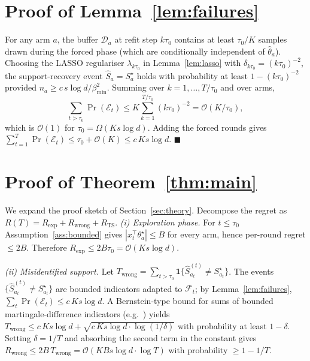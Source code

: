 \documentclass[10pt,journal,twoside,twocolumn]{IEEEtran}
\begin{document}
\section{Proof of Lemma~\ref{lem:failures}}\label{app:failures}

For any arm $a$, the buffer $\mathcal{D}_a$ at refit step $k\tau_0$ contains at least $\tau_0/K$ samples drawn during the forced phase (which are conditionally independent of $\hat\theta_a$). Choosing the LASSO regulariser $\lambda_{k\tau_0}$ in Lemma~\ref{lem:lasso} with $\delta_{k\tau_0} = (k\tau_0)^{-2}$, the support-recovery event $\hat{S}_a = S^\star_a$ holds with probability at least $1 - (k\tau_0)^{-2}$ provided $n_a \geq c\,s\log d/\beta_{\min}^2$. Summing over $k = 1, \dots, T/\tau_0$ and over arms,
\[
\sum_{t > \tau_0} \Pr(\mathcal{E}_t) \leq K \sum_{k=1}^{T/\tau_0} (k\tau_0)^{-2} = \mathcal{O}(K/\tau_0),
\]
which is $\mathcal{O}(1)$ for $\tau_0 = \Omega(Ks\log d)$. Adding the forced rounds gives $\sum_{t=1}^T \Pr(\mathcal{E}_t) \leq \tau_0 + \mathcal{O}(K) \leq c\,Ks\log d$. \hfill$\blacksquare$

\section{Proof of Theorem~\ref{thm:main}}\label{app:main}

We expand the proof sketch of Section~\ref{sec:theory}. Decompose the regret as
$
R(T) = R_{\mathrm{exp}} + R_{\mathrm{wrong}} + R_{\mathrm{TS}}.
$
\emph{(i) Exploration phase.} For $t \leq \tau_0$ Assumption~\ref{ass:bounded} gives $|x_t^\top \theta^\star_a| \leq B$ for every arm, hence per-round regret $\leq 2B$. Therefore $R_{\mathrm{exp}} \leq 2B\tau_0 = \mathcal{O}(Ks\log d)$.

\emph{(ii) Misidentified support.} Let $T_{\mathrm{wrong}} = \sum_{t > \tau_0} \mathbf{1}\{\hat{S}_{a_t}^{(t)} \neq S^\star_{a_t}\}$. The events $\{\hat{S}_{a_t}^{(t)} \neq S^\star_{a_t}\}$ are bounded indicators adapted to $\mathcal{F}_t$; by Lemma~\ref{lem:failures}, $\sum_t \Pr(\mathcal{E}_t) \leq c\,Ks\log d$. A Bernstein-type bound for sums of bounded martingale-difference indicators (e.g.~\cite[Sec.~A.7]{lattimore2020bandit}) yields $T_{\mathrm{wrong}} \leq c\,Ks\log d + \sqrt{c\,K s \log d \cdot \log(1/\delta)}$ with probability at least $1 - \delta$. Setting $\delta = 1/T$ and absorbing the second term in the constant gives $R_{\mathrm{wrong}} \leq 2B\,T_{\mathrm{wrong}} = \mathcal{O}(KBs\log d \cdot \log T)$ with probability $\geq 1 - 1/T$.
\end{document}
